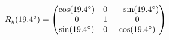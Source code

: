 \documentclass[preview]{standalone}
\begin{document}
\begin{align*}
\special{dvisvgm:raw <g id='unique000'>}R_y(19.4^\circ) = \begin{pmatrix} \cos(19.4^\circ) & 0 & -\sin(19.4^\circ) \\ 0 & 1 & 0 \\ \sin(19.4^\circ) & 0 & \cos(19.4^\circ) \end{pmatrix}\special{dvisvgm:raw </g>}
\end{align*}
\end{document}
